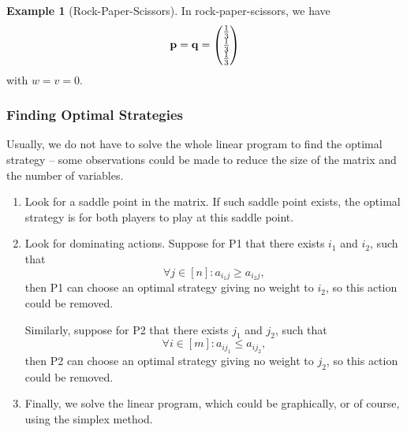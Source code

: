 \documentclass[11pt]{article}
\theoremstyle{definition}
\newtheorem{example}[theorem]{Example}
\theoremstyle{remark}
\newcommand{\bqty}[1]{\left[#1\right]}
\newcommand{\flatfrac}[2]{\frac{#1}{#2}}
\begin{document}
\begin{example}[Rock-Paper-Scissors]\label{optim-unit-0063}
    In rock-paper-scissors, we have
    \[
        \vb{p} = \vb{q} = \begin{pmatrix}
            \flatfrac{1}{3} \\ \flatfrac{1}{3} \\ \flatfrac{1}{3}
        \end{pmatrix}
    \]
    with \(w = v = 0\).
\end{example}

\subsubsection{Finding Optimal Strategies}

Usually, we do not have to solve the whole linear program to find the optimal strategy -- some observations could be made to reduce the size of the matrix and the number of variables.

\begin{enumerate}
    \item Look for a saddle point in the matrix. If such saddle point exists, the optimal strategy is for both players to play at this saddle point.
    \item Look for dominating actions. Suppose for P1 that there exists \(i_1\) and \(i_2\), such that
    \[
        \forall j \in \bqty{n}: a_{i_1 j} \geq a_{i_2 j},
    \]
    then P1 can choose an optimal strategy giving no weight to \(i_2\), so this action could be removed.

    Similarly, suppose for P2 that there exists \(j_1\) and \(j_2\), such that
    \[
        \forall i \in \bqty{m}: a_{i j_1} \leq a_{i j_2},
    \]
    then P2 can choose an optimal strategy giving no weight to \(j_2\), so this action could be removed.
    \item Finally, we solve the linear program, which could be graphically, or of course, using the simplex method.
\end{enumerate}
\end{document}

